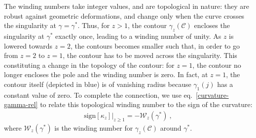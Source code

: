 The winding numbers take integer values, and are topological in nature: they are robust against geometric deformations, and change only when the curve crosses the singularity at $\gamma=\gamma^{*}$. Thus, for \(z>1\), the contour \(\gamma_z(\mathcal{C})\) encloses the singularity at \(\gamma^*\) exactly once, leading to a winding number of unity. As \(z\) is lowered towards \(z=2\), the contours becomes smaller such that, in order to go from \(z=2\) to \(z=1\), the contour has to be moved across the singularity. This constituting a change in the topology of the contour: for \(z=1\), the contour no longer encloses the pole and the winding number is zero. In fact, at \(z=1\), the contour itself (depicted in blue) is of vanishing radius because \(\gamma_1(j)\) has a constant value of zero.
To complete the connection, we use eq.~\eqref{curvature-gamma-rel} to relate this topological winding number to the sign of the curvature:
\begin{equation}\begin{aligned}
	\label{sign-pos}
	\text{sign}\left[\kappa_z\right]\bigg\vert_{z \geq 1} = -\mathcal{W}_z(\gamma^*)~,
\end{aligned}\end{equation}
where \(\mathcal{W}_z(\gamma^*)\) is the winding number for \(\gamma_z(\mathcal{C})\) around \(\gamma^*\).

